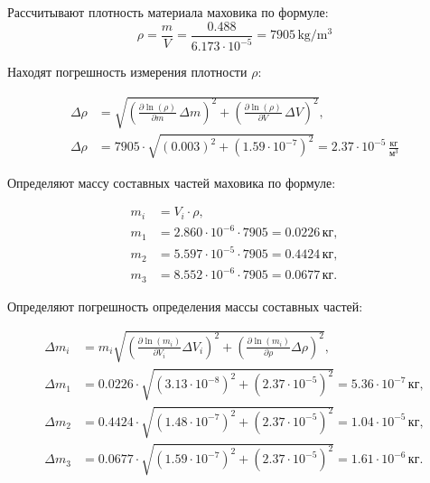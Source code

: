 Рассчитывают плотность материала маховика по формуле:
\begin{equation}
\rho = \frac{m}{V} = \frac{0.488}{6.173 \cdot 10^{-5}}
= 7905 \,\si{\kilo\gram\per\cubic\meter}
\end{equation}

Находят погрешность измерения плотности $\rho$:

\begin{equation}
	\begin{alignedat}{2}
		\Delta \rho &= 
		\sqrt{\left( \frac{\partial \ln(\rho)}{\partial m} \, \Delta m \right)^{2} +
			\left( \frac{\partial \ln(\rho)}{\partial V} \, \Delta V \right)^{2}}, \\[1ex]
		\Delta \rho &= 7905 \cdot 
		\sqrt{(0.003)^{2} + (1.59 \cdot 10^{-7})^{2}}
		= 2.37 \cdot 10^{-5}\,\frac{\text{кг}}{\text{м}^3}
	\end{alignedat}
\end{equation}

Определяют массу составных частей маховика по формуле:

\begin{equation}
	\begin{alignedat}{1}
		m_i &= V_i \cdot \rho, \\[1ex]
		m_1 &= 2.860 \cdot 10^{-6} \cdot 7905 = 0.0226 \,\text{кг}, \\[1ex]
		m_2 &= 5.597 \cdot 10^{-5} \cdot 7905 = 0.4424 \,\text{кг}, \\[1ex]
		m_3 &= 8.552 \cdot 10^{-6} \cdot 7905 = 0.0677 \,\text{кг}.
	\end{alignedat}
\end{equation}

Определяют погрешность определения массы составных частей:

\begin{equation}
	\begin{aligned}
		\Delta m_i &= m_i \sqrt{
			\left( \frac{\partial \ln(m_i)}{\partial V_i} \Delta V_i \right)^{2} +
			\left( \frac{\partial \ln(m_i)}{\partial \rho} \Delta \rho \right)^{2}}, \\[1ex]
		\Delta m_1 &= 0.0226 \cdot \sqrt{(3.13 \cdot 10^{-8})^{2} + (2.37 \cdot 10^{-5})^{2}}
		= 5.36 \cdot 10^{-7}\,\text{кг}, \\[1ex]
		\Delta m_2 &= 0.4424 \cdot \sqrt{(1.48 \cdot 10^{-7})^{2} + (2.37 \cdot 10^{-5})^{2}}
		= 1.04 \cdot 10^{-5}\,\text{кг}, \\[1ex]
		\Delta m_3 &= 0.0677 \cdot \sqrt{(1.59 \cdot 10^{-7})^{2} + (2.37 \cdot 10^{-5})^{2}}
		= 1.61 \cdot 10^{-6}\,\text{кг}.
	\end{aligned}
\end{equation}

